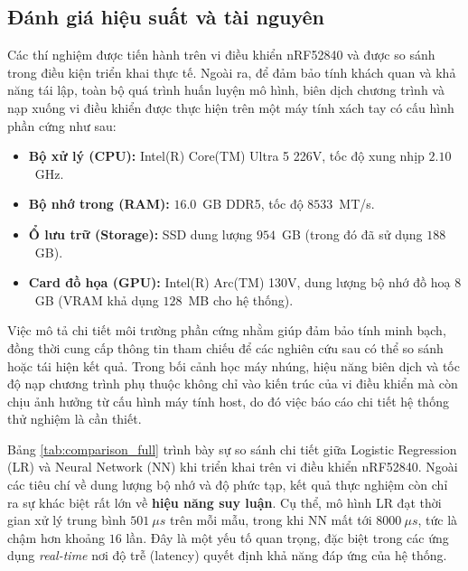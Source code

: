 \subsection{Đánh giá hiệu suất và tài nguyên}

Các thí nghiệm được tiến hành trên vi điều khiển nRF52840 và được so sánh trong điều kiện triển khai thực tế. 
Ngoài ra, để đảm bảo tính khách quan và khả năng tái lập, toàn bộ quá trình huấn luyện mô hình, biên dịch chương trình 
và nạp xuống vi điều khiển được thực hiện trên một máy tính xách tay có cấu hình phần cứng như sau:

\begin{itemize}
    \item \textbf{Bộ xử lý (CPU):} Intel(R) Core(TM) Ultra 5 226V, tốc độ xung nhịp $2.10$~GHz.
    \item \textbf{Bộ nhớ trong (RAM):} $16.0$~GB DDR5, tốc độ $8533$~MT/s.
    \item \textbf{Ổ lưu trữ (Storage):} SSD dung lượng $954$~GB (trong đó đã sử dụng $188$~GB).
    \item \textbf{Card đồ họa (GPU):} Intel(R) Arc(TM) 130V, dung lượng bộ nhớ đồ hoạ $8$~GB (VRAM khả dụng $128$~MB cho hệ thống).
\end{itemize}

Việc mô tả chi tiết môi trường phần cứng nhằm giúp đảm bảo tính minh bạch, 
đồng thời cung cấp thông tin tham chiếu để các nghiên cứu sau có thể so sánh hoặc tái hiện kết quả. 
Trong bối cảnh học máy nhúng, hiệu năng biên dịch và tốc độ nạp chương trình phụ thuộc không chỉ vào 
kiến trúc của vi điều khiển mà còn chịu ảnh hưởng từ cấu hình máy tính host, do đó việc báo cáo chi tiết hệ thống thử nghiệm là cần thiết.


Bảng \ref{tab:comparison_full} trình bày sự so sánh chi tiết giữa Logistic Regression (LR) và Neural Network (NN) khi triển khai trên vi điều khiển nRF52840. Ngoài các tiêu chí về dung lượng bộ nhớ và độ phức tạp, kết quả thực nghiệm còn chỉ ra sự khác biệt rất lớn về \textbf{hiệu năng suy luận}. Cụ thể, mô hình LR đạt thời gian xử lý trung bình $501~\mu s$ trên mỗi mẫu, trong khi NN mất tới $8000~\mu s$, tức là chậm hơn khoảng $16$ lần. Đây là một yếu tố quan trọng, đặc biệt trong các ứng dụng \textit{real-time} nơi độ trễ (latency) quyết định khả năng đáp ứng của hệ thống.

